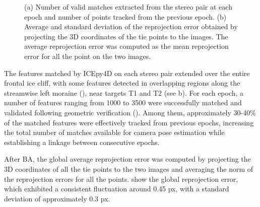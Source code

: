 \begin{figure}
  \centering
  \caption{(a) Number of valid matches extracted from the stereo pair at each epoch and
    number of points tracked from the previous epoch.
    (b) Average and standard deviation of the reprojection error
    obtained by projecting the 3D coordinates of the tie points to the images.
    The average reprojection error was computed as the mean
    reprojection error for all the point on the two images.}
  \label{fig:4:matches_stats}
\end{figure}

The features matched by ICEpy4D on each stereo pair extended over the entire frontal ice cliff, with some features detected in overlapping regions along the
streamwise left moraine (), near targets T1 and T2 (see b).
For each epoch, a number of features ranging from 1000 to 3500 were successfully matched and validated following geometric verification ().
Among them, approximately 30-40\% of the matched features were effectively tracked from previous epochs, increasing the total number of matches available for
camera pose estimation while establishing a linkage between consecutive epochs.

After BA, the global average reprojection error was computed by projecting the 3D coordinates of all the tie points to the two images and averaging
the norm of the reprojection errors for all the points.
 show the global reprojection error, which exhibited a consistent fluctuation around 0.45 px, with a standard deviation of approximately 0.3 px.

